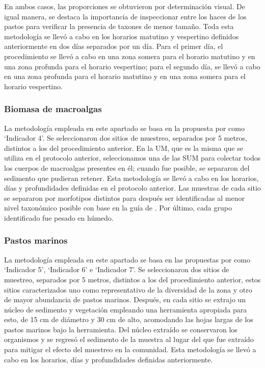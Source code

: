 \documentclass[
  authoryear,
  preprint,
  3p,
  twocolumn]{elsarticle}
\begin{document}
En ambos casos, las proporciones se obtuvieron por determinación visual.
De igual manera, se destaca la importancia de inspeccionar entre los
haces de los pastos para verificar la presencia de taxones de menor
tamaño. Toda esta metodología se llevó a cabo en los horarios matutino y
vespertino definidos anteriormente en dos días separados por un día.
Para el primer día, el procedimiento se llevó a cabo en una zona somera
para el horario matutino y en una zona profunda para el horario
vespertino; para el segundo día, se llevó a cabo en una zona profunda
para el horario matutino y en una zona somera para el horario
vespertino.

\subsubsection{Biomasa de macroalgas}\label{biomasa-de-macroalgas}

La metodología empleada en este apartado se basa en la propuesta por
\citet{Botello2022} como `Indicador 4'. Se seleccionaron dos sitios de
muestreo, separados por 5 metros, distintos a los del procedimiento
anterior. En la UM, que es la misma que se utiliza en el protocolo
anterior, seleccionamos una de las SUM para colectar todos los cuerpos
de macroalgas presentes en él; cuando fue posible, se separaron del
sedimento que pudieran retener. Esta metodología se llevó a cabo en los
horarios, días y profundidades definidas en el protocolo anterior. Las
muestras de cada sitio se separaron por morfotipos distintos para
después ser identificadas al menor nivel taxonómico posible con base en
la guía de \citet{Littler1989}. Por último, cada grupo identificado fue
pesado en húmedo.

\subsubsection{Pastos marinos}\label{pastos-marinos}

La metodología empleada en este apartado se basa en las propuestas por
\citet{Botello2022} como `Indicador 5', `Indicador 6' e `Indicador 7'.
Se seleccionaron dos sitios de muestreo, separados por 5 metros,
distintos a los del procedimiento anterior, estos sitios caracterizados
uno como representativo de la diversidad de la zona y otro de mayor
abundancia de pastos marinos. Después, en cada sitio se extrajo un
núcleo de sedimento y vegetación empleando una herramienta apropiada
para esto, de 15 cm de diámetro y 30 cm de alto, acomodando las hojas
largas de los pastos marinos bajo la herramienta. Del núcleo extraído se
conservaron los organismos y se regresó el sedimento de la muestra al
lugar del que fue extraído para mitigar el efecto del muestreo en la
comunidad. Esta metodología se llevó a cabo en los horarios, días y
profundidades definidas anteriormente.
\end{document}
